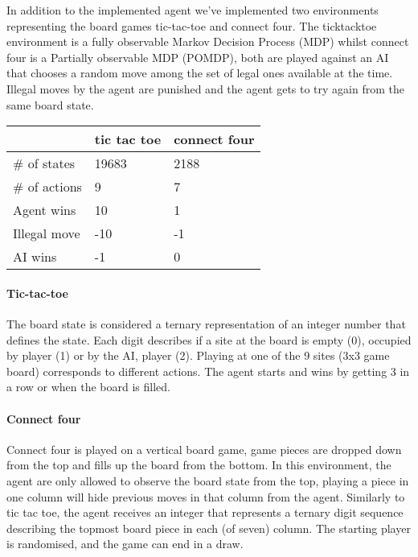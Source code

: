 In addition to the implemented agent we've implemented two environments representing the board games tic-tac-toe and connect four. The ticktacktoe environment is a fully observable Markov Decision Process (MDP) whilst connect four is a Partially observable MDP (POMDP), both are played against an AI that chooses a random move among the set of legal ones available at the time. Illegal moves by the agent are punished and the agent gets to try again from the same board state.

\begin{tabular}{ l l | l }
& tic tac toe & connect four \\
\hline
  \# of states 	& 19683 	& 2188 \\
  \# of actions  	& 9 		& 7 \\
  Agent wins 	& 10 		& 1 \\
  Illegal move 	& -10 	& -1 \\
  AI wins	 	& -1 		& 0 \\
\end{tabular}

\paragraph{Tic-tac-toe}

The board state is considered a ternary representation of an integer number that defines the state. Each digit describes if a site at the board is empty (0), occupied by player (1) or by the AI, player (2). Playing at one of the 9 sites (3x3 game board) corresponds to different actions. The agent starts and wins by getting 3 in a row or when the board is filled.

\paragraph{Connect four}

Connect four is played on a vertical board game, game pieces are dropped down from the top and fills up the board from the bottom. In this environment, the agent are only allowed to observe the board state from the top, playing a piece in one column will hide previous moves in that column from the agent. Similarly to tic tac toe, the agent receives an integer that represents a ternary digit sequence describing the topmost board piece in each (of seven) column. The starting player is randomised, and the game can end in a draw.